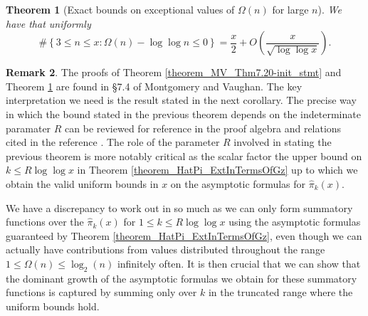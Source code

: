 \documentclass[11pt,reqno,a4letter]{article}
\numberwithin{figure}{section}
\numberwithin{table}{section}
\theoremstyle{plain}
\newtheorem{theorem}{Theorem}
\numberwithin{theorem}{section}
\theoremstyle{definition}
\newtheorem{remark}[theorem]{Remark}
\begin{document}
\begin{theorem}[Exact bounds on exceptional values of $\Omega(n)$ for large $n$] 
\label{theorem_MV_Thm7.21-init_stmt} 
We have that uniformly 
\[
\#\left\{3 \leq n \leq x: \Omega(n) - \log\log n \leq 0\right\} = 
     \frac{x}{2} + O\left(\frac{x}{\sqrt{\log\log x}}\right). 
\]
\end{theorem} 

\begin{remark} 
The proofs of Theorem \ref{theorem_MV_Thm7.20-init_stmt} and 
Theorem \ref{theorem_MV_Thm7.21-init_stmt} 
are found in \S{7.4} of Montgomery and Vaughan. 
The key interpretation we need is the result stated in the next corollary. 
The precise way in which the bound 
stated in the previous theorem depends on the 
indeterminate paramater $R$ can be reviewed for reference in the proof 
algebra and relations cited in the reference \cite[\S 7]{MV}. 
The role of the parameter $R$ involved in stating the previous theorem 
is more notably critical as the scalar factor the upper bound on $k \leq R\log\log x$ in 
Theorem \ref{theorem_HatPi_ExtInTermsOfGz} up to which 
we obtain the valid uniform bounds in $x$ on the asymptotic formulas for 
$\widehat{\pi}_k(x)$. 

We have a discrepancy to work out in so much as we 
can only form summatory functions over the $\widehat{\pi}_k(x)$ for 
$1 \leq k \leq R\log\log x$ using the asymptotic formulas
guaranteed by Theorem \ref{theorem_HatPi_ExtInTermsOfGz}, even though we can actually 
have contributions from values distributed throughout the range $1 \leq \Omega(n) \leq \log_2(n)$ 
infinitely often. 
It is then crucial that we can show that the dominant growth of the asymptotic formulas we obtain 
for these summatory functions is captured by summing only over $k$ in the truncated range 
where the uniform bounds hold. 
\end{remark} 
\end{document}
